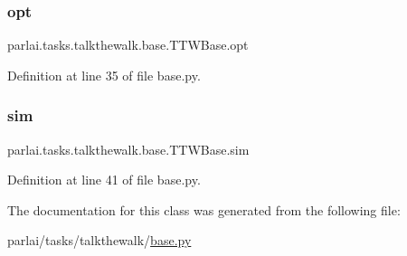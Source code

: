 \subsubsection{\texorpdfstring{opt}{opt}}
{\footnotesize\ttfamily parlai.\+tasks.\+talkthewalk.\+base.\+T\+T\+W\+Base.\+opt}



Definition at line 35 of file base.\+py.

\mbox{\label{classparlai_1_1tasks_1_1talkthewalk_1_1base_1_1TTWBase_a723ca7277cb3040cbfef0d9ef3161df3}} 
\subsubsection{\texorpdfstring{sim}{sim}}
{\footnotesize\ttfamily parlai.\+tasks.\+talkthewalk.\+base.\+T\+T\+W\+Base.\+sim}



Definition at line 41 of file base.\+py.



The documentation for this class was generated from the following file\+:\begin{DoxyCompactItemize}
\item 
parlai/tasks/talkthewalk/\hyperlink{base_8py}{base.\+py}\end{DoxyCompactItemize}
